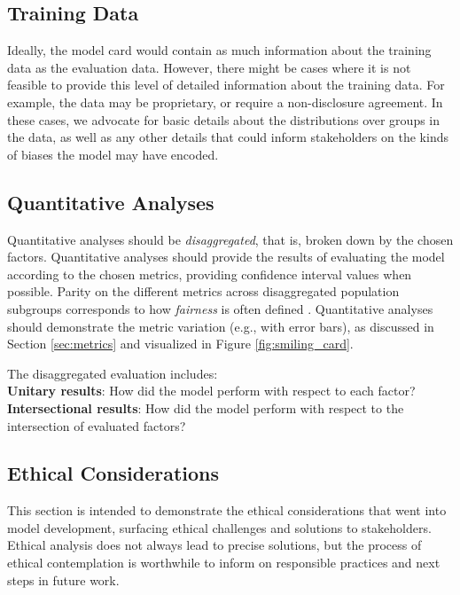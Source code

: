 \subsection{Training Data}
Ideally, the model card would contain as much information about the training data as the evaluation data. However, there might be cases where it is not feasible to provide this level of detailed information about the training data. For example, the data may be proprietary, or require a non-disclosure agreement. In these cases, we advocate for basic details about the distributions over groups in the data, as well as any other details that could inform stakeholders on the kinds of biases the model may have encoded.
\subsection{Quantitative Analyses}
Quantitative analyses should be {\it disaggregated}, that is, broken down by the chosen factors.  Quantitative analyses should provide the results of evaluating the model according to the chosen metrics, providing confidence interval values when possible.  Parity on the different metrics across disaggregated population subgroups corresponds to how {\it fairness} is often defined \cite{verma2018fairness,MitchellEtAl2018}.  Quantitative analyses should demonstrate the metric variation (e.g., with error bars), as discussed in Section \ref{sec:metrics} and visualized in Figure \ref{fig:smiling_card}.  

\noindent The disaggregated evaluation includes: \\
{\bf Unitary results}:  How did the model perform with respect to each factor? \\
{\bf Intersectional results}:  How did the model perform with respect to the intersection of evaluated factors?

\subsection{Ethical Considerations}

This section is intended to demonstrate the ethical considerations that went into model development, surfacing ethical challenges and solutions to stakeholders.  Ethical analysis does not always lead to precise solutions, but the process of ethical contemplation is worthwhile to inform on responsible practices and next steps in future work.


